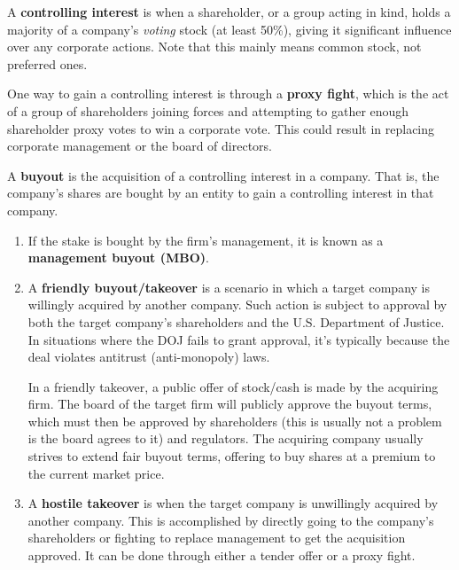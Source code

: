\documentclass{article}
\begin{document}
    \begin{definition}
      A \textbf{controlling interest} is when a shareholder, or a group acting in kind, holds a majority of a company's \textit{voting} stock (at least 50\%), giving it significant influence over any corporate actions. Note that this mainly means common stock, not preferred ones. 
    \end{definition}

    \begin{definition}
      One way to gain a controlling interest is through a \textbf{proxy fight}, which is the act of a group of shareholders joining forces and attempting to gather enough shareholder proxy votes to win a corporate vote. This could result in replacing corporate management or the board of directors. 
    \end{definition}

    \begin{definition}[Buyout]
      A \textbf{buyout} is the acquisition of a controlling interest in a company. That is, the company's shares are bought by an entity to gain a controlling interest in that company.  
      \begin{enumerate}
        \item If the stake is bought by the firm's management, it is known as a \textbf{management buyout (MBO)}.
        \item A \textbf{friendly buyout/takeover} is a scenario in which a target company is willingly acquired by another company. Such action is subject to approval by both the target company's shareholders and the U.S. Department of Justice. In situations where the DOJ fails to grant approval, it's typically because the deal violates antitrust (anti-monopoly) laws. 
        
        In a friendly takeover, a public offer of stock/cash is made by the acquiring firm. The board of the target firm will publicly approve the buyout terms, which must then be approved by shareholders (this is usually not a problem is the board agrees to it) and regulators. The acquiring company usually strives to extend fair buyout terms, offering to buy shares at a premium to the current market price.
        \item A \textbf{hostile takeover} is when the target company is unwillingly acquired by another company. This is accomplished by directly going to the company's shareholders or fighting to replace management to get the acquisition approved. It can be done through either a tender offer or a proxy fight. 
      \end{enumerate}
    \end{definition}
\end{document}
